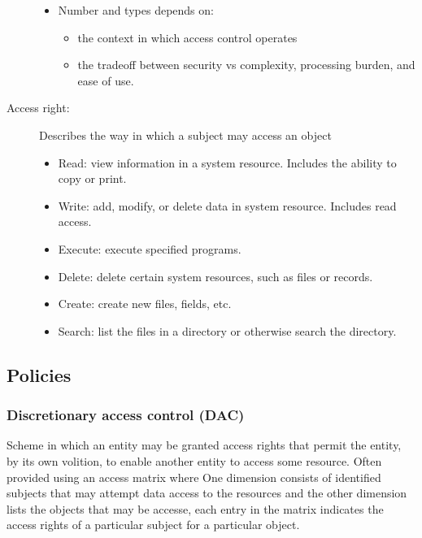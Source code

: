 \documentclass{article}
\begin{document}
\begin{description}
\begin{itemize}
                        \item Number and types depends on:
                        \begin{itemize}
                            \item the context in which access control operates
                            \item the tradeoff between security vs complexity, processing burden, and ease of use.
                        \end{itemize}
                    \end{itemize}
                    \item[Access right:] Describes the
                    way in which a
                    subject may
                    access an object
                    \begin{itemize}
                        \item Read: view information in a system resource. Includes the ability to copy or print.
                        \item Write: add, modify, or delete data in system resource. Includes read access.
                        \item Execute: execute specified programs.
                        \item Delete: delete certain system resources, such as files or records.
                        \item Create: create new files, fields, etc.
                        \item Search: list the files in a directory or otherwise search the directory.
                    \end{itemize}
                \end{description}
            \subsection{Policies}
                \subsubsection{Discretionary access
                control (DAC)}Scheme in which an entity may be granted
                access rights that permit the entity, by its
                own volition, to enable another entity to
                access some resource. Often provided using an access matrix where One dimension consists of identified subjects
                that may attempt data access to the resources and the other dimension lists the objects that may
                be accesse, each entry in the matrix indicates the access
                rights of a particular subject for a particular
                object. 
\end{document}
